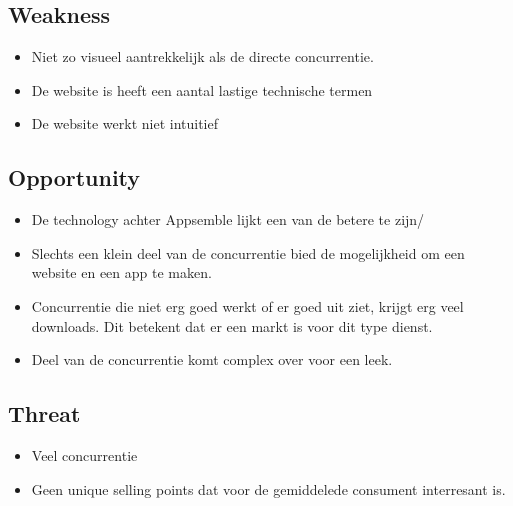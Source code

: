 \subsection{Weakness}
\begin{itemize}
	\item Niet zo visueel aantrekkelijk als de directe concurrentie.
	
	\item De website is heeft een aantal lastige technische termen
	
	\item De website werkt niet intuitief
	
\end{itemize}
\subsection{Opportunity}
\begin{itemize}
	\item De technology achter Appsemble lijkt een van de betere te zijn/
	
	\item Slechts een klein deel van de concurrentie bied de mogelijkheid om een website en een app te maken.
	
	\item Concurrentie die niet erg goed werkt of er goed uit ziet, krijgt erg veel downloads. Dit betekent dat er een markt is voor dit type dienst.
	
	\item Deel van de concurrentie komt complex over voor een leek.
\end{itemize}
\subsection{Threat}
\begin{itemize}
	\item Veel concurrentie
	
	\item Geen unique selling points dat voor de gemiddelede consument interresant is.
\end{itemize}





